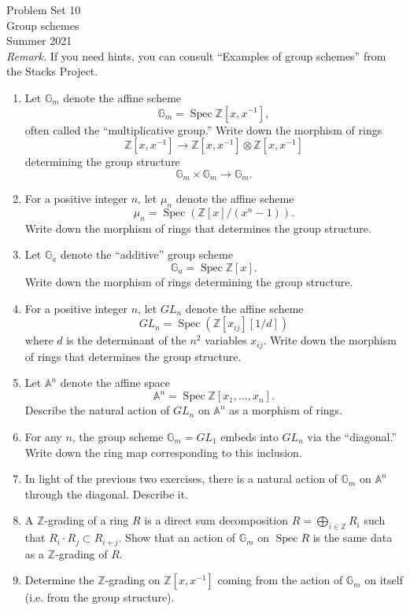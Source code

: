 \documentclass[12pt]{article}
\DeclareMathOperator{\Spec}{Spec}
\theoremstyle{definition}
\theoremstyle{theorem}
\begin{document}
\noindent Problem Set 10 \\
\noindent Group schemes \\
\noindent Summer 2021 \\

\noindent \emph{Remark.} If you need hints, you can consult ``Examples of group schemes'' from the Stacks Project. 

\begin{enumerate}[label=\textbf{\arabic*.}]
\item Let $\mathbb{G}_m$ denote the affine scheme 
\[
\mathbb{G}_m = \Spec \mathbb{Z}[x,x^{-1}],
\]
often called the ``multiplicative group.''
Write down the morphism of rings 
\[
\mathbb{Z}[x,x^{-1}] \to \mathbb{Z}[x,x^{-1}] \otimes \mathbb{Z}[x,x^{-1}]
\]
determining the group structure 
\[
\mathbb{G}_m \times \mathbb{G}_m \to \mathbb{G}_m.
\]
\item For a positive integer $n$, let $\mu_n$ denote the affine scheme 
\[
\mu_n = \Spec (\mathbb{Z}[x]/(x^n - 1)).
\] 
Write down the morphism of rings that determines the group structure. 
\item Let $\mathbb{G}_a$ denote the ``additive'' group scheme
\[
\mathbb{G}_a = \Spec \mathbb{Z}[x].
\] 
Write down the morphism of rings determining the group structure. 
\item For a positive integer $n$, let $GL_n$ denote the affine scheme 
\[
GL_n = \Spec( \mathbb{Z}[x_{ij}][1/d])
\]
where $d$ is the determinant of the $n^2$ variables $x_{ij}$. Write down the morphism of rings that determines the group structure. 
\item Let $\mathbb{A}^n$ denote the affine space 
\[
\mathbb{A}^n = \Spec \mathbb{Z}[x_1, \ldots, x_n]. 
\]
Describe the natural action of $GL_n$ on $\mathbb{A}^n$ as a morphism of rings. 
\item For any $n$, the group scheme $\mathbb{G}_m = GL_1$ embeds into $GL_n$ via the ``diagonal.'' Write down the ring map corresponding to this inclusion. 
\item In light of the previous two exercises, there is a natural action of $\mathbb{G}_m$ on $\mathbb{A}^n$ through the diagonal. Describe it.
\item A $\mathbb{Z}$-grading of a ring $R$ is a direct sum decomposition $R = \bigoplus_{i \in \mathbb{Z}} R_i$ such that $R_i \cdot R_j \subset R_{i+j}$. Show that an action of $\mathbb{G}_m$ on $\Spec R$ is the same data as a $\mathbb{Z}$-grading of $R$. 
\item Determine the $\mathbb{Z}$-grading on $\mathbb{Z}[x,x^{-1}]$ coming from the action of $\mathbb{G}_m$ on itself (i.e. from the group structure). 

\end{enumerate}
\end{document}
